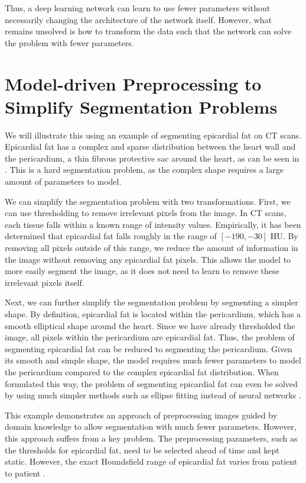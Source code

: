 
Thus, a deep learning network can learn to use fewer parameters without necessarily changing the architecture of the network itself. However, what remains unsolved is how to transform the data such that the network can solve the problem with fewer parameters.

\section{Model-driven Preprocessing to Simplify Segmentation Problems}

We will illustrate this using an example of segmenting epicardial fat on CT scans. Epicardial fat has a complex and sparse distribution between the heart wall and the pericardium, a thin fibrous protective sac around the heart, as can be seen in . This is a hard segmentation problem, as the complex shape requires a large amount of parameters to model. 

We can simplify the segmentation problem with two transformations. First, we can use thresholding to remove irrelevant pixels from the image. In CT scans, each tissue falls within a known range of intensity values. Empirically, it has been determined that epicardial fat falls roughly in the range of $[-190, -30]$ HU. By removing all pixels outside of this range, we reduce the amount of information in the image without removing any epicardial fat pixels. This allows the model to more easily segment the image, as it does not need to learn to remove these irrelevant pixels itself.

Next, we can further simplify the segmentation problem by segmenting a simpler shape. By definition, epicardial fat is located within the pericardium, which has a smooth elliptical shape around the heart. Since we have already thresholded the image, all pixels within the pericardium are epicardial fat. Thus, the problem of segmenting epicardial fat can be reduced to segmenting the pericardium. Given its smooth and simple shape, the model requires much fewer parameters to model the pericardium compared to the complex epicardial fat distribution. When formulated this way, the problem of segmenting epicardial fat can even be solved by using much simpler methods such as ellipse fitting instead of neural networks .

This example demonstrates an approach of preprocessing images guided by domain knowledge to allow segmentation with much fewer parameters. However, this approach suffers from a key problem. The preprocessing parameters, such as the thresholds for epicardial fat, need to be selected ahead of time and kept static. However, the exact Houndsfield range of epicardial fat varies from patient to patient . 

